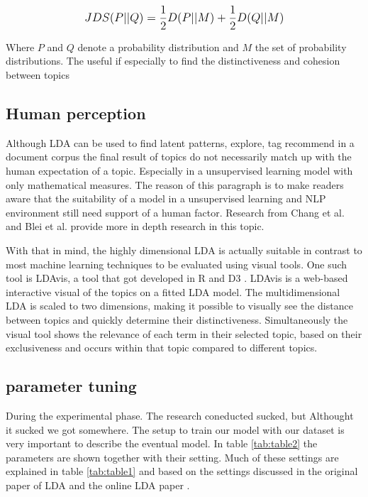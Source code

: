 \[
\mathlarger{JDS(P||Q) = \frac{1}{2}D(P||M) + \frac{1}{2}D(Q||M)}
\]

Where $P$ and $Q$ denote a probability distribution and $M$ the set of probability distributions. The useful if especially to find the distinctiveness and cohesion between topics

\subsection{Human perception}\label{methodology:humanperception}
Although LDA can be used to find latent patterns, explore, tag recommend in a document corpus the final result of topics do not necessarily match up with the human expectation of a topic. Especially in a unsupervised learning model with only mathematical measures\cite{Towne2016MeasuringPerception}. The reason of this paragraph is to make readers aware that the suitability of a model in a unsupervised learning and NLP environment still need support of a human factor. Research from Chang  et al. \cite{Chang2009ReadingModels} and Blei et al. \cite{Chaney2012VisualizingModels.} provide more in depth research in this topic.  

With that in mind, the highly dimensional LDA is actually suitable in contrast to most machine learning techniques to be evaluated using visual tools. One such tool is LDAvis, a tool that got developed in R and D3 \cite{Sievert2014}. LDAvis is a web-based interactive visual of the topics on a fitted LDA model. The multidimensional LDA is scaled to two dimensions, making it possible to visually see the distance between topics and quickly determine their distinctiveness. Simultaneously the visual tool shows the relevance of each term in their selected topic, based on their exclusiveness and occurs within that topic compared to different topics.

\subsection{parameter tuning}\label{methodology:parameter tuning}
During the experimental phase. The research coneducted sucked, but Althought it sucked we got somewhere. 
The setup to train our model with our dataset is very important to describe the eventual model. In table \ref{tab:table2} the parameters are shown together with their setting. Much of these settings are explained in table \ref{tab:table1} and based on the settings discussed in the original paper of LDA \cite{Blei2003} and the online LDA paper \cite{Hoffman2010OnlineAllocation}. 

